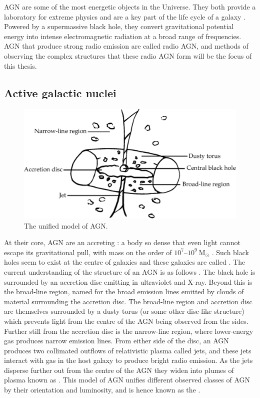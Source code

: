     AGN are some of the most energetic objects in the Universe. They both provide a laboratory for extreme physics and are a key part of the life cycle of a galaxy \citep{heckman_coevolution_2014}. Powered by a supermassive black hole, they convert gravitational potential energy into intense electromagnetic radiation at a broad range of frequencies. AGN that produce strong radio emission are called radio AGN, and methods of observing the complex structures that these radio AGN form will be the focus of this thesis.

    \subsection{Active galactic nuclei}
    \label{sec:agn}

        \begin{figure}
            \centering
            \includegraphics[width=\textwidth]{images/agn.eps}
            \caption{\label{fig:agn} The unified model of AGN.}
        \end{figure}

        At their core, AGN are an accreting : a body so dense that even light cannot escape its gravitational pull, with mass on the order of $10^7$--$10^9\ \mathrm{M}_\odot$ \citeneeded{}. Such black holes seem to exist at the centre of galaxies\citeneeded{} and these galaxies are called . The current understanding of the structure of an AGN is as follows \citep{urry_unified_1995}. The black hole is surrounded by an accretion disc emitting in ultraviolet and X-ray. Beyond this is the broad-line region, named for the broad emission lines emitted by clouds of material surrounding the accretion disc. The broad-line region and accretion disc are themselves surrounded by a dusty torus (or some other disc-like structure) which prevents light from the centre of the AGN being observed from the sides. Further still from the accretion disc is the narrow-line region, where lower-energy gas produces narrow emission lines. From either side of the disc, an AGN produces two collimated outflows of relativistic plasma called {jets}, and these jets interact with gas in the host galaxy to produce bright radio emission. As the jets disperse further out from the centre of the AGN they widen into plumes of plasma known as . This model of AGN unifies different observed classes of AGN by their orientation and luminosity, and is hence known as the  \citep{antonucci_unified_1993}.

